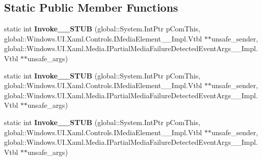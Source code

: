 \subsection*{Static Public Member Functions}
\begin{DoxyCompactItemize}
\item 
\mbox{\label{struct_windows_1_1_foundation_1_1_typed_event_handler___a___windows___u_i___xaml___controls___meab68a8b38914bc3ba3e7f1414dd848fa_a2574928f832dada48d5c4678cc62559c}} 
static int {\bfseries Invoke\+\_\+\+\_\+\+S\+T\+UB} (global\+::\+System.\+Int\+Ptr p\+Com\+This, global\+::\+Windows.\+U\+I.\+Xaml.\+Controls.\+I\+Media\+Element\+\_\+\+\_\+\+Impl.\+Vtbl $\ast$$\ast$unsafe\+\_\+sender, global\+::\+Windows.\+U\+I.\+Xaml.\+Media.\+I\+Partial\+Media\+Failure\+Detected\+Event\+Args\+\_\+\+\_\+\+Impl.\+Vtbl $\ast$$\ast$unsafe\+\_\+args)
\item 
\mbox{\label{struct_windows_1_1_foundation_1_1_typed_event_handler___a___windows___u_i___xaml___controls___meab68a8b38914bc3ba3e7f1414dd848fa_a2574928f832dada48d5c4678cc62559c}} 
static int {\bfseries Invoke\+\_\+\+\_\+\+S\+T\+UB} (global\+::\+System.\+Int\+Ptr p\+Com\+This, global\+::\+Windows.\+U\+I.\+Xaml.\+Controls.\+I\+Media\+Element\+\_\+\+\_\+\+Impl.\+Vtbl $\ast$$\ast$unsafe\+\_\+sender, global\+::\+Windows.\+U\+I.\+Xaml.\+Media.\+I\+Partial\+Media\+Failure\+Detected\+Event\+Args\+\_\+\+\_\+\+Impl.\+Vtbl $\ast$$\ast$unsafe\+\_\+args)
\item 
\mbox{\label{struct_windows_1_1_foundation_1_1_typed_event_handler___a___windows___u_i___xaml___controls___meab68a8b38914bc3ba3e7f1414dd848fa_a2574928f832dada48d5c4678cc62559c}} 
static int {\bfseries Invoke\+\_\+\+\_\+\+S\+T\+UB} (global\+::\+System.\+Int\+Ptr p\+Com\+This, global\+::\+Windows.\+U\+I.\+Xaml.\+Controls.\+I\+Media\+Element\+\_\+\+\_\+\+Impl.\+Vtbl $\ast$$\ast$unsafe\+\_\+sender, global\+::\+Windows.\+U\+I.\+Xaml.\+Media.\+I\+Partial\+Media\+Failure\+Detected\+Event\+Args\+\_\+\+\_\+\+Impl.\+Vtbl $\ast$$\ast$unsafe\+\_\+args)
\item 

\end{DoxyCompactItemize}
